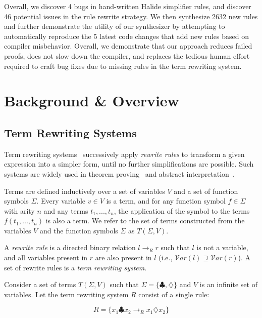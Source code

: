 \documentclass[sigplan,10pt,review,anonymous]{acmart}\settopmatter{printfolios=true,printccs=false,printacmref=false}
\newcommand{\NumRulesFixed}{{\color{black} 4}\xspace}
\newcommand{\NumOrderingProblems}{{\color{black} 46}\xspace}
\newcommand{\NumRulesSynthesized}{{\color{black} 2632}\xspace}
\newcommand{\NumBugsAutomated}{{\color{black} 5}\xspace}
\begin{document}
Overall, we discover \NumRulesFixed bugs in hand-written Halide simplifier rules, and discover \NumOrderingProblems
potential issues in the rule rewrite strategy.  We then synthesize \NumRulesSynthesized new rules 
and further demonstrate the utility of our synthesizer by attempting to
automatically reproduce the \NumBugsAutomated latest code changes that add new
rules based on compiler misbehavior.
Overall, we demonstrate that our approach
reduces failed proofs,  does not slow down the compiler, and replaces the
tedious human effort required to craft bug fixes due to missing rules in the
term rewriting system.

\section{Background \& Overview}
\subsection{Term Rewriting Systems}
Term rewriting systems~\cite{gorn1967} successively apply \textit{rewrite rules} to transform a given
expression into a simpler form, until no further simplifications are possible.  Such systems are widely
used in theorem proving~\cite{baader1999term} and abstract interpretation~\cite{cousot1977abstract, cousot1979systematic}.

Terms are defined inductively over a set of variables $V$ and a set of function symbols $\Sigma$. Every variable $v \in V$ is a term, and for any function symbol $f \in \Sigma$ with arity $n$ and any terms $t_1, ..., t_n$, the application of the symbol to the terms $f(t_1, ..., t_n)$ is also a term. We refer to the set of terms constructed from the variables $V$ and the function symbols $\Sigma$ as $T(\Sigma, V)$.

A \emph{rewrite rule} is a directed binary relation $l \rightarrow_R r$ such that $l$ is not a variable, and all variables present in $r$ are also present in $l$ (i.e., $\mathcal{V}ar(l) \supseteq \mathcal{V}ar(r)$). A set of rewrite rules is a \emph{term rewriting system}.

Consider a set of terms $T(\Sigma, V)$ such that $\Sigma = \{\clubsuit, \diamondsuit\}$ and $V$ is an infinite set of variables. Let the term rewriting system $R$ consist of a single rule:

\[ R = \{ x_1 \clubsuit x_2 \rightarrow_R x_1 \diamondsuit x_2 \} \]
\end{document}
